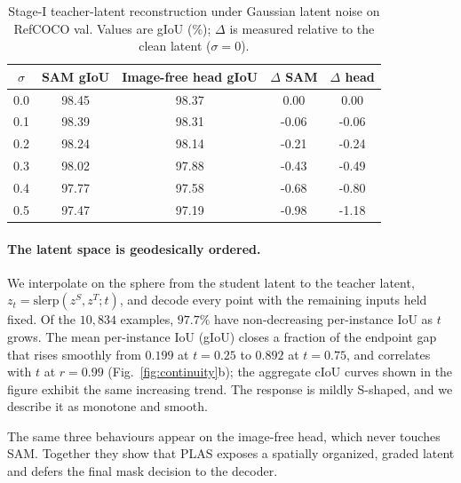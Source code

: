 \begin{table}[t]
  \centering
  \scriptsize
  \setlength{\tabcolsep}{3.5pt}
  \renewcommand{\arraystretch}{0.96}
  \caption{Stage-I teacher-latent reconstruction under Gaussian latent noise on RefCOCO val. Values are gIoU (\%); $\Delta$ is measured relative to the clean latent ($\sigma=0$).}
  \label{tab:teacher_noise}
  \begin{tabular}{c|cc|cc}
    \toprule
    $\sigma$ & SAM gIoU & Image-free head gIoU & $\Delta$ SAM & $\Delta$ head \\
    \midrule
    0.0 & 98.45 & 98.37 & 0.00 & 0.00 \\
    0.1 & 98.39 & 98.31 & -0.06 & -0.06 \\
    0.2 & 98.24 & 98.14 & -0.21 & -0.24 \\
    0.3 & 98.02 & 97.88 & -0.43 & -0.49 \\
    0.4 & 97.77 & 97.58 & -0.68 & -0.80 \\
    0.5 & 97.47 & 97.19 & -0.98 & -1.18 \\
    \bottomrule
  \end{tabular}
\end{table}

\paragraph{The latent space is geodesically ordered.}
We interpolate on the sphere from the student latent to the teacher latent, $z_t=\mathrm{slerp}(z^S,z^T;t)$, and decode every point with the remaining inputs held fixed. Of the $10{,}834$ examples, $97.7\%$ have non-decreasing per-instance IoU as $t$ grows. The mean per-instance IoU (gIoU) closes a fraction of the endpoint gap that rises smoothly from $0.199$ at $t{=}0.25$ to $0.892$ at $t{=}0.75$, and correlates with $t$ at $r=0.99$ (Fig.~\ref{fig:continuity}b); the aggregate cIoU curves shown in the figure exhibit the same increasing trend. The response is mildly S-shaped, and we describe it as monotone and smooth.

The same three behaviours appear on the image-free head, which never touches SAM. Together they show that PLAS exposes a spatially organized, graded latent and defers the final mask decision to the decoder.
